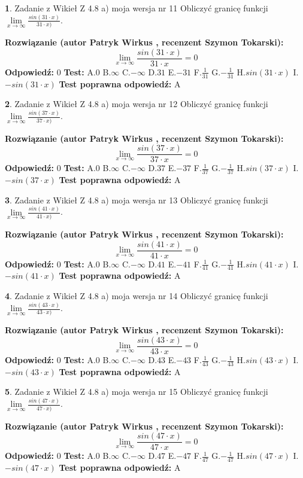 \documentclass[12pt, a4paper]{article}
\theoremstyle{definition} %
\newtheorem{zad}{}
\newcommand{\zadStart}[1]{\begin{zad}#1\newline}
\newcommand{\zadStop}{\end{zad}}
\newcommand{\rozwStart}[2]{\noindent \textbf{Rozwiązanie (autor #1 , recenzent #2): }\newline}
\newcommand{\rozwStop}{\newline}
\newcommand{\odpStart}{\noindent \textbf{Odpowiedź:}\newline}
\newcommand{\odpStop}{\newline}
\newcommand{\testStart}{\noindent \textbf{Test:}\newline}
\newcommand{\testStop}{\newline}
\newcommand{\kluczStart}{\noindent \textbf{Test poprawna odpowiedź:}\newline}
\newcommand{\kluczStop}{\newline}
\begin{document}
\zadStart{Zadanie z Wikieł Z 4.8 a) moja wersja nr 11}
Obliczyć granicę funkcji $\lim\limits_{x\to \infty}\frac{sin(31\cdot x)}{31\cdot x)}$.
\zadStop
\rozwStart{Patryk Wirkus}{Szymon Tokarski}
$$\lim\limits_{x\to \infty}\frac{sin(31\cdot x)}{31\cdot x}=
0$$
\rozwStop
\odpStart
$0$
\odpStop
\testStart
A.$0$ B.$\infty$ C.$-\infty$ D.$31$ E.$-31$
F.$\frac{1}{31}$ G.$-\frac{1}{31}$
H.$sin(31\cdot x)$
I.$-sin(31\cdot x)$
\testStop
\kluczStart
A
\kluczStop



\zadStart{Zadanie z Wikieł Z 4.8 a) moja wersja nr 12}
Obliczyć granicę funkcji $\lim\limits_{x\to \infty}\frac{sin(37\cdot x)}{37\cdot x)}$.
\zadStop
\rozwStart{Patryk Wirkus}{Szymon Tokarski}
$$\lim\limits_{x\to \infty}\frac{sin(37\cdot x)}{37\cdot x}=
0$$
\rozwStop
\odpStart
$0$
\odpStop
\testStart
A.$0$ B.$\infty$ C.$-\infty$ D.$37$ E.$-37$
F.$\frac{1}{37}$ G.$-\frac{1}{37}$
H.$sin(37\cdot x)$
I.$-sin(37\cdot x)$
\testStop
\kluczStart
A
\kluczStop



\zadStart{Zadanie z Wikieł Z 4.8 a) moja wersja nr 13}
Obliczyć granicę funkcji $\lim\limits_{x\to \infty}\frac{sin(41\cdot x)}{41\cdot x)}$.
\zadStop
\rozwStart{Patryk Wirkus}{Szymon Tokarski}
$$\lim\limits_{x\to \infty}\frac{sin(41\cdot x)}{41\cdot x}=
0$$
\rozwStop
\odpStart
$0$
\odpStop
\testStart
A.$0$ B.$\infty$ C.$-\infty$ D.$41$ E.$-41$
F.$\frac{1}{41}$ G.$-\frac{1}{41}$
H.$sin(41\cdot x)$
I.$-sin(41\cdot x)$
\testStop
\kluczStart
A
\kluczStop



\zadStart{Zadanie z Wikieł Z 4.8 a) moja wersja nr 14}
Obliczyć granicę funkcji $\lim\limits_{x\to \infty}\frac{sin(43\cdot x)}{43\cdot x)}$.
\zadStop
\rozwStart{Patryk Wirkus}{Szymon Tokarski}
$$\lim\limits_{x\to \infty}\frac{sin(43\cdot x)}{43\cdot x}=
0$$
\rozwStop
\odpStart
$0$
\odpStop
\testStart
A.$0$ B.$\infty$ C.$-\infty$ D.$43$ E.$-43$
F.$\frac{1}{43}$ G.$-\frac{1}{43}$
H.$sin(43\cdot x)$
I.$-sin(43\cdot x)$
\testStop
\kluczStart
A
\kluczStop



\zadStart{Zadanie z Wikieł Z 4.8 a) moja wersja nr 15}
Obliczyć granicę funkcji $\lim\limits_{x\to \infty}\frac{sin(47\cdot x)}{47\cdot x)}$.
\zadStop
\rozwStart{Patryk Wirkus}{Szymon Tokarski}
$$\lim\limits_{x\to \infty}\frac{sin(47\cdot x)}{47\cdot x}=
0$$
\rozwStop
\odpStart
$0$
\odpStop
\testStart
A.$0$ B.$\infty$ C.$-\infty$ D.$47$ E.$-47$
F.$\frac{1}{47}$ G.$-\frac{1}{47}$
H.$sin(47\cdot x)$
I.$-sin(47\cdot x)$
\testStop
\kluczStart
A
\kluczStop
\end{document}
